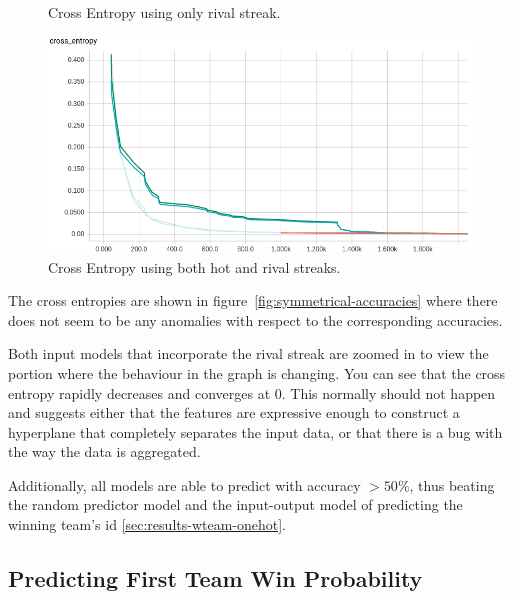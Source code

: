 \documentclass{article} %
\begin{document}
\begin{figure}[!htb]
  \caption{Cross Entropy using only rival streak.}\label{fig:symmetrical-r-crossentropy}
\endminipage
{}%
  \includegraphics[width=\linewidth]{plots/model1/symmetrical/streak-hr/crossentropy.png}
  \caption{Cross Entropy using both hot and rival streaks.}\label{fig:symmetrical-hr-crossentropy}
\endminipage
\end{figure}
\label{fig:symmetrical-accuracies}

The cross entropies are shown in figure~\ref{fig:symmetrical-accuracies} where there does not seem to be any anomalies with respect to the corresponding accuracies.

Both input models that incorporate the rival streak are zoomed in to view the portion where the behaviour in the graph is changing.  You can see that the cross entropy rapidly decreases and converges at 0.  This normally should not happen and suggests either that the features are expressive enough to construct a hyperplane that completely separates the input data, or that there is a bug with the way the data is aggregated.

Additionally, all models are able to predict with accuracy $> 50\%$, thus beating the random predictor model and the input-output model of predicting the winning team's id \ref{sec:results-wteam-onehot}.

\subsection{Predicting First Team Win Probability}
\label{sec:results-first-team-win-probability}
\end{document}
